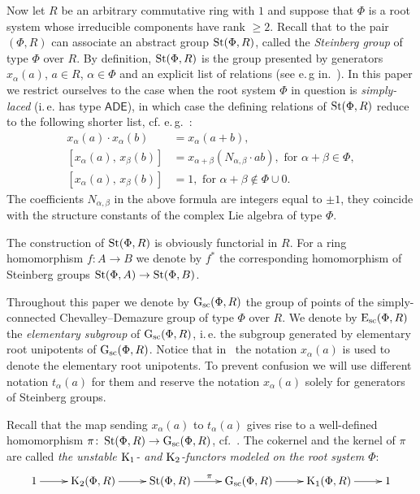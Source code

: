 Now let $R$ be an arbitrary commutative ring with $1$ and suppose that $\Phi$ is a root system whose irreducible components have rank $\geq 2$.
Recall that to the pair $(\Phi, R)$ can associate an abstract group $\operatorname{St}(\Phi, R)$, called the \textit{Steinberg group} of type $\Phi$ over $R$.
By definition, $\operatorname{St}(\Phi, R)$ is the group presented by generators $x_\alpha(a)$, $a \in R$, $\alpha \in \Phi$ and an explicit list of relations (see e.\,g in.~\cite{Ma69, St71}).
In this paper we restrict ourselves to the case when the root system $\Phi$ in question is \textit{simply-laced} (i.\,e. has type $\mathsf{ADE}$),
 in which case the defining relations of $\operatorname{St}(\Phi, R)$ reduce to the following shorter list, cf. e.\,g.~\cite[\S~2.2]{S15}:
\begin{align}
x_{\alpha}(a)\cdot x_{\alpha}(b)&=x_{\alpha}(a+b), \tag{R1} \label{x-additivity}\\
[x_{\alpha}(a),\,x_{\beta}(b)]  &=x_{\alpha+\beta}(N_{\alpha,\beta} \cdot ab),\text{ for }\alpha+\beta\in\Phi, \tag{R2} \label{R2} \\
[x_{\alpha}(a),\,x_{\beta}(b)]  &=1,\text{ for }\alpha+\beta\not\in\Phi\cup0. \tag{R3} \label{R3}
\end{align}
The coefficients $N_{\alpha,\beta}$ in the above formula are integers equal to $\pm 1$, they coincide with the structure constants of the complex Lie algebra of type $\Phi$.

The construction of $\operatorname{St}(\Phi, R)$ is obviously functorial in $R$.
For a ring homomorphism $ f\colon A \to B$ we denote by $f^*$ the corresponding homomorphism of Steinberg groups $\operatorname{St}(\Phi, A) \to \operatorname{St}(\Phi, B)$.

Throughout this paper we denote by $\operatorname{G}_\mathrm{sc}(\Phi, R)$ the group of points of the simply-connected Chevalley--Demazure group of type $\Phi$ over $R$.
We denote by $\operatorname{E}_\mathrm{sc}(\Phi, R)$ the \textit{elementary subgroup} of $\operatorname{G}_\mathrm{sc}(\Phi, R)$, i.\,e. the subgroup generated by elementary root unipotents of $\operatorname{G}_\mathrm{sc}(\Phi, R)$.
Notice that in~\cite{Vav09, VP} the notation $x_\alpha(a)$ is used to denote the elementary root unipotents.
To prevent confusion we will use different notation $t_\alpha(a)$ for them and reserve the notation $x_\alpha(a)$ solely for generators of Steinberg groups.

Recall that the map sending $x_\alpha(a)$ to $t_\alpha(a)$ gives rise to a well-defined homomorphism $\pi \colon \operatorname{St}(\Phi, R) \to \operatorname{G}_\mathrm{sc}(\Phi, R)$, cf.~\cite[\S~1A]{St78}.
The cokernel and the kernel of $\pi$ are called \textit{the unstable $\operatorname{K}_1$- and $\operatorname{K}_2$-functors modeled on the root system $\Phi$}:
\begin{equation} \label{eq:K1-K2-sequence}
  \xymatrix{ 1 \ar[r] & \K_2(\Phi, R) \ar[r] & \St(\Phi, R) \ar[r]^{\pi} & \Gsc(\Phi, R) \ar[r] & \K_1(\Phi, R) \ar[r] & 1}
\end{equation}

